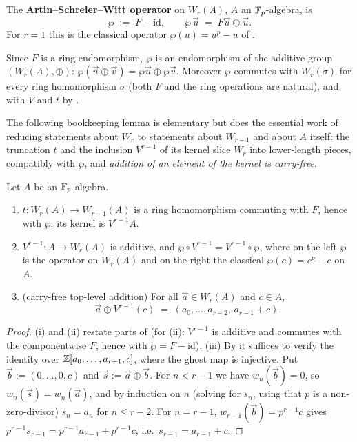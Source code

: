 \begin{definition}\label{definition:asw_operator:reorg}
The \textbf{Artin--Schreier--Witt operator} on $W_r(A)$, $A$ an $\mathbb{F}_p$-algebra, is
\[
\wp \;:=\; F - \mathrm{id},
\qquad
\wp\,\vec u \;=\; F\vec u \ominus \vec u .
\]
For $r = 1$ this is the classical operator $\wp(u) = u^p - u$ of
.
\end{definition}

Since $F$ is a ring endomorphism, $\wp$ is an endomorphism of the additive group
$(W_r(A), \oplus)$:
$\wp(\vec u \oplus \vec v) = \wp\vec u \oplus \wp\vec v$. Moreover $\wp$ commutes with
$W_r(\sigma)$ for every ring homomorphism $\sigma$ (both $F$ and the ring operations
are natural), and with $V$ and $t$ by .

The following bookkeeping lemma is elementary but does the essential work of reducing
statements about $W_r$ to statements about $W_{r-1}$ and about $A$ itself: the
truncation $t$ and the inclusion $V^{r-1}$ of its kernel slice $W_r$ into lower-length
pieces, compatibly with $\wp$, and \emph{addition of an element of the kernel is
carry-free}.

\begin{lemma}\label{lemma:witt_bookkeeping:reorg}
Let $A$ be an $\mathbb{F}_p$-algebra.
\begin{enumerate}[label=(\roman*)]
    \item $t \colon W_r(A) \to W_{r-1}(A)$ is a ring homomorphism commuting with $F$,
    hence with $\wp$; its kernel is $V^{r-1} A$.
    \item $V^{r-1} \colon A \to W_r(A)$ is additive, and
    $\wp \circ V^{r-1} = V^{r-1} \circ \wp$, where on the left $\wp$ is the operator
    on $W_r(A)$ and on the right the classical $\wp(c) = c^p - c$ on $A$.
    \item (carry-free top-level addition) For all $\vec a \in W_r(A)$ and $c \in A$,
    \[
    \vec a \oplus V^{r-1}(c) \;=\; (a_0, \dots, a_{r-2},\, a_{r-1} + c).
    \]
\end{enumerate}
\end{lemma}

\begin{proof}
(i) and (ii) restate parts of  (for (ii): $V^{r-1}$
is additive and commutes with the componentwise $F$, hence with
$\wp = F - \mathrm{id}$).
(iii) By  it suffices to verify the identity over
$\mathbb{Z}[a_0, \dots, a_{r-1}, c]$, where the ghost map is injective. Put
$\vec b := (0, \dots, 0, c)$ and $\vec s := \vec a \oplus \vec b$. For $n < r-1$ we
have $w_n(\vec b) = 0$, so $w_n(\vec s) = w_n(\vec a)$, and by induction on $n$
(solving for $s_n$, using that $p$ is a non-zero-divisor) $s_n = a_n$ for
$n \leq r-2$. For $n = r-1$, $w_{r-1}(\vec b) = p^{r-1} c$ gives
$p^{r-1} s_{r-1} = p^{r-1} a_{r-1} + p^{r-1} c$, i.e.\ $s_{r-1} = a_{r-1} + c$.
\end{proof}

